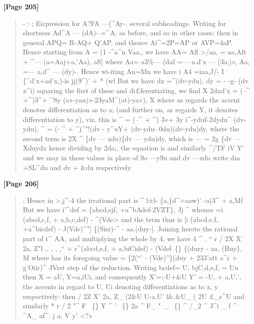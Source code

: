 \documentclass[11pt,a4paper]{book}
\begin{document}
\textbf{[Page 205]}\\[0.2cm]
\begin{quote}
-
: ;
Eicpression for A?FA ---(\textasciicircum{}Ay-. several subheadings.
Writing for shortness Ad\textasciicircum{}A --- (dA)- =\textasciicircum{}A, as before, and so in other cases: then
in general APQ= R-AQ+ Q'AP, and thence Ai\textasciicircum{}=2P=AP or AVP=4aP. Hence
starting from A = (1 -\textasciicircum{}a\textasciicircum{}n Vaa,, we have
AA= Afl >/aa, = aa,Aft + \textasciicircum{}--- (a=Aaj+a,'Aa),
aS]
where
Aa= a3\%---
(daf
=---
a.d'x
---
(3a;)», Aa,
=---
a,d\textasciicircum{}
---
(dy)-.
Hence wi-iting
An=Mn
we have
i
A4 =iaa,J/- I \{\textasciicircum{}d'x+ad'x,)-is jj(9\textasciicircum{})' + * (wl
But we have
dx =\textasciicircum{}(dv-ydu), dy = - -g- (dv x\textasciicircum{}i)
squaring the first of these and di£ferentiating, we find
X
2dxd'x = (--\textasciicircum{} +\textasciicircum{})3\textasciicircum{}+ \textasciicircum{}Sy (a»-yau)»-23yaM\textasciicircum{}(at)-ya«),
X
where as regards the accent denotes differentiation as to a; (and further on, as
regards Y, it denotes differentiation to y), viz. this is
\textasciicircum{}
= (--\textasciicircum{} + \textasciicircum{}) 3«+ 3y i\textasciicircum{}-yduf-2dydu\textasciicircum{} (dv-ydu),
\textasciicircum{}
= (- \textasciicircum{} + \textasciicircum{}j\textasciicircum{}"!(dv - y\textasciicircum{}uY+ (dv-ydu- 0du)(dv-ydu)dy,
where the second term is
2X
\textasciicircum{} \{dv --- xdu)\{dv --- ydu)dy,
which is
---
=
2g \{dv
---Xduydx
hence dividing by 2da;, the equation is
and similarly
\textasciicircum{}/TF iV Y'
and we may in these values in place of 9o ---y9u and dv ---xdu write dm +SL\textasciicircum{}du and
dv + \&du respectively.
\end{quote}

\textbf{[Page 206]}\\[0.2cm]
\begin{quote}
;
Hence in >,j\textasciicircum{}-4 the irrational part is
\textasciicircum{} l±l- \{a,\{d\textasciicircum{}+aaw)' -a(3\textasciicircum{} + a,Mf
But we have
i'\textasciicircum{}def
=
\{abcd,ejf,
+a\textasciicircum{}bAdef-2VZT\},
Jj
\textasciicircum{}
whence
=i (abcd,c,f, + a,b,c,def) - \textasciicircum{}(Vde>
and the term thus is
[i (abcd.e.f, +a\textasciicircum{}bicdef) - J(Vde)\textasciicircum{}"] \{(Sisr)-\textasciicircum{} - aa.(duy-].
Joining hereto the rational part of t\textasciicircum{} AA, and multiplying the whole by 4, we have
4 \textasciicircum{} . `` r / 2X X' 2a, Z"l ,. , , ,``
+ r\textasciicircum{}(abcd,e,f, + a,biCidef) - (Vdef~\{\} \{(dury - aa, (Buy\},
M
where has its foregoing value = \{2(``' - (Vde)''\}(duy + 233'att a\textasciicircum{}r + g'Oiir)\textasciicircum{}
JVrst step of the reduction.
Writing bcdef= U, bjC,d,e,f, = Uu then X = aU, Y=a,iUi, and consequently
X'=:-U+\&U Y' = -U, + a,U,',
the accents in regard to U, Ui denoting differentiations as to x, y respectively: then
/ 2Z X' 2a, Z\_ (2\&U U-a.U'  l\&.\&U\_ ( 2U £\_s\textasciicircum{}U
and similarly
* r / 2 "\textasciicircum{} F ~\{\} Y \textasciicircum{} ' ~\{\} 2a \textasciicircum{} F\_ " \_ ~\{\} \textasciicircum{} /\_2 \textasciicircum{} J\textasciicircum{}i \_ f \textasciicircum{} \textasciicircum{}A\_ af\textasciicircum{}.
j a, V y' <?»
\end{quote}
\end{document}

